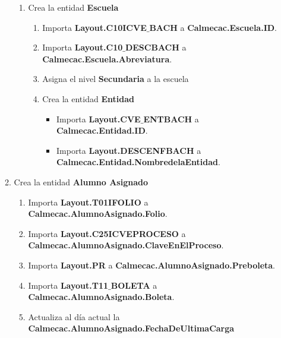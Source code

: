 \begin{enumerate}
\begin{enumerate}
\begin{enumerate}
			\item Crea la entidad \textbf{Escuela}
			
				\begin{enumerate}
				
				\item Importa \textbf{Layout.C10ICVE$\_$BACH} a \textbf{Calmecac.Escuela.ID}.
				
				\item Importa \textbf{Layout.C10$\_$DESCBACH} a \textbf{Calmecac.Escuela.Abreviatura}.
				
				\item Asigna el nivel \textbf{Secundaria} a la escuela
				
				\item Crea la entidad \textbf{Entidad}
				
					\begin{itemize}
		
					\item Importa \textbf{Layout.CVE$\_$ENTBACH} a \textbf{Calmecac.Entidad.ID}.
					
					\item Importa \textbf{Layout.DESCENFBACH} a \textbf{Calmecac.Entidad.NombredelaEntidad}.
					
					\end{itemize}
				
				\end{enumerate}	

			\end{enumerate}
		
		\item Crea la entidad \textbf{Alumno Asignado}
		
			\begin{enumerate}
				
			\item Importa \textbf{Layout.T01IFOLIO} a \textbf{Calmecac.AlumnoAsignado.Folio}.
			
			\item Importa \textbf{Layout.C25ICVEPROCESO} a \textbf{Calmecac.AlumnoAsignado.ClaveEnElProceso}.
			
			\item \label{IN-DAE-PR1:preboleta} Importa \textbf{Layout.PR} a \textbf{Calmecac.AlumnoAsignado.Preboleta}.
			
			\item \label{IN-DAE-PR1:boleta} Importa \textbf{Layout.T11$\_$BOLETA} a \textbf{Calmecac.AlumnoAsignado.Boleta}.
			
			\item Actualiza al día actual la \textbf{Calmecac.AlumnoAsignado.FechaDeUltimaCarga}
				

\end{enumerate}
\end{enumerate}
\end{enumerate}
